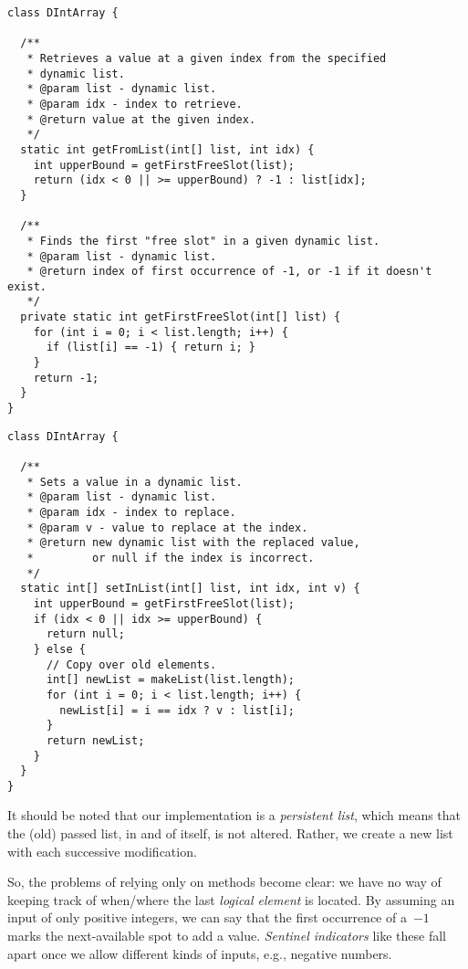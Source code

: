 \begin{lstlisting}[language=MyJava]
class DIntArray {

  /**
   * Retrieves a value at a given index from the specified
   * dynamic list.
   * @param list - dynamic list. 
   * @param idx - index to retrieve. 
   * @return value at the given index.
   */
  static int getFromList(int[] list, int idx) {
    int upperBound = getFirstFreeSlot(list);
    return (idx < 0 || >= upperBound) ? -1 : list[idx];
  }

  /**
   * Finds the first "free slot" in a given dynamic list.
   * @param list - dynamic list.
   * @return index of first occurrence of -1, or -1 if it doesn't exist.
   */
  private static int getFirstFreeSlot(int[] list) {
    for (int i = 0; i < list.length; i++) {
      if (list[i] == -1) { return i; }
    }
    return -1;
  }
}
\end{lstlisting}

\begin{lstlisting}[language=MyJava]
class DIntArray {

  /**
   * Sets a value in a dynamic list. 
   * @param list - dynamic list.
   * @param idx - index to replace.
   * @param v - value to replace at the index.
   * @return new dynamic list with the replaced value, 
   *         or null if the index is incorrect.
   */
  static int[] setInList(int[] list, int idx, int v) {
    int upperBound = getFirstFreeSlot(list);
    if (idx < 0 || idx >= upperBound) {
      return null;
    } else {
      // Copy over old elements.
      int[] newList = makeList(list.length);
      for (int i = 0; i < list.length; i++) {
        newList[i] = i == idx ? v : list[i];  
      }
      return newList;
    }
  }
}
\end{lstlisting}

It should be noted that our implementation is a \emph{persistent list}, which means that the (old) passed list, in and of itself, is not altered. 
Rather, we create a new list with each successive modification.

So, the problems of relying only on methods become clear: we have no way of keeping track of when/where the last \emph{logical element} is located. 
By assuming an input of only positive integers, we can say that the first occurrence of a~$-1$ marks the next-available spot to add a value. \emph{Sentinel indicators} like these fall apart once we allow different kinds of inputs, e.g., negative numbers. 

